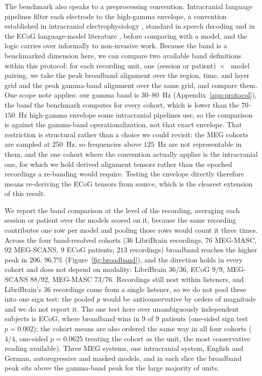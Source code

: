 \documentclass{article}
\begin{document}
The benchmark also speaks to a preprocessing convention. Intracranial
language pipelines filter each electrode to the high-gamma envelope, a convention
established in intracranial electrophysiology \citep{crone2006high, ray2011different}, standard in
speech decoding \citep{anumanchipalli2019speech, chen2024neural} and in the ECoG language-model
literature \citep{goldstein2022shared}, before
comparing with a model, and the logic carries over informally to non-invasive
work. Because the band is a benchmarked dimension here, we can compare two available
band definitions within this protocol: for each recording unit, one (session or patient)~$\times$~
model pairing, we take the peak broadband alignment over the region, time, and
layer grid and the peak gamma-band alignment over the same grid, and compare
them. One scope note applies: our gamma band is $30$--$80$~Hz
(Appendix~\ref{app:protocol}), the band the benchmark computes for every cohort, which is
lower than the $70$--$150$~Hz high-gamma envelope some intracranial pipelines use,
so the comparison is against the gamma-band operationalization, not that exact
envelope. That restriction is structural rather than a choice we could revisit: the MEG cohorts
are sampled at $250$~Hz, so frequencies above $125$~Hz are not representable in them, and the one
cohort where the convention actually applies is the intracranial one, for which we hold derived
alignment tensors rather than the epoched recordings a re-banding would require. Testing the
envelope directly therefore means re-deriving the ECoG tensors from source, which is the clearest
extension of this result.

We report the band comparison at the level of the recording, averaging each session or
patient over the models scored on it, because the same recording contributes one row
per model and pooling those rows would count it three times. Across the four
band-resolved cohorts ($36$ LibriBrain recordings, $76$ MEG-MASC, $92$ MEG-SCANS, $9$
ECoG patients; $213$ recordings) broadband reaches the higher peak in $206$,
$96.7\%$ (Figure~\ref{fig:broadband}), and the direction holds in every cohort and
does not depend on modality: LibriBrain $36/36$, ECoG $9/9$, MEG-SCANS $88/92$,
MEG-MASC $73/76$. Recordings still nest within listeners, and LibriBrain's $36$
recordings come from a single listener, so we do not pool these into one sign test:
the pooled $p$ would be anticonservative by orders of magnitude and we do not report
it. The one test here over unambiguously independent subjects is ECoG, where
broadband wins in $9$ of $9$ patients (one-sided sign test $p = 0.002$); the cohort means are
also ordered the same way in all four cohorts ($4/4$, one-sided $p = 0.0625$ treating the
cohort as the unit, the most conservative reading available). Three MEG systems,
one intracranial system, English and German, autoregressive and masked models,
and in each slice the broadband peak sits above the gamma-band peak for the large
majority of units.
\end{document}

